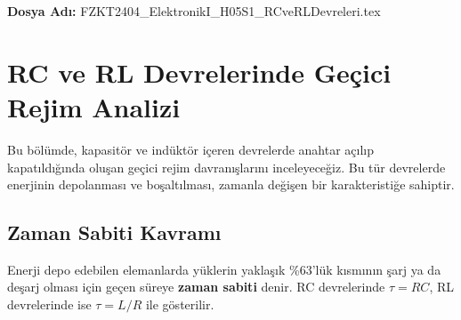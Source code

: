 \documentclass[11pt,letterpaper,twocolumn]{fenbil}
\begin{document}

\begin{center}
\textbf{Dosya Adı:} FZKT2404\_ElektronikI\_H05S1\_RCveRLDevreleri.tex
\end{center}

\section{RC ve RL Devrelerinde Geçici Rejim Analizi}

Bu bölümde, kapasitör ve indüktör içeren devrelerde anahtar açılıp kapatıldığında oluşan geçici rejim davranışlarını inceleyeceğiz. Bu tür devrelerde enerjinin depolanması ve boşaltılması, zamanla değişen bir karakteristiğe sahiptir.

\subsection{Zaman Sabiti Kavramı}

\begin{tcolorbox}[title=ÖNEMLİ]
Enerji depo edebilen elemanlarda yüklerin yaklaşık \%63'lük kısmının şarj ya da deşarj olması için geçen süreye \textbf{zaman sabiti} denir. RC devrelerinde $\tau = RC$, RL devrelerinde ise $\tau = L/R$ ile gösterilir.
\end{tcolorbox}
\end{document}
